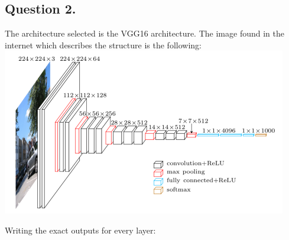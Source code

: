 \documentclass[a4paper]{iacas}
\begin{document}
\subsection{Question 2.}
The architecture selected is the VGG16 architecture. The image found in the internet which describes the structure is the following:
\newline
\includegraphics[scale=0.6]{imgs/vgg_arc.PNG}
\newline

Writing the exact outputs for every layer:
\end{document}
